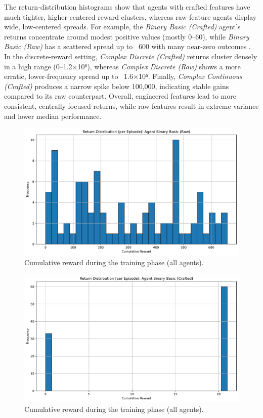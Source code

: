\documentclass[sigconf]{acmart}
\begin{document}
The return‐distribution histograms show that agents with crafted features have much tighter, higher‐centered reward clusters, whereas raw‐feature agents display wide, low‐centered spreads. For example, the \emph{Binary Basic (Crafted)} agent’s returns concentrate around modest positive values (mostly 0–60), while \emph{Binary Basic (Raw)} has a scattered spread up to ~600 with many near‐zero outcomes . In the discrete‐reward setting, \emph{Complex Discrete (Crafted)} returns cluster densely in a high range (0–1.2×10⁶), whereas \emph{Complex Discrete (Raw)} shows a more erratic, lower‐frequency spread up to ~1.6×10⁵. Finally, \emph{Complex Continuous (Crafted)} produces a narrow spike below 100,000, indicating stable gains compared to its raw counterpart. Overall, engineered features lead to more consistent, centrally focused returns, while raw features result in extreme variance and lower median performance.

\bigskip

\begin{figure}[t]
  \centering
  \includegraphics[width=\textwidth]{return_distribution_Binary Basic (Raw).pdf}
  \caption{Cumulative reward during the training phase (all agents).}
  \label{fig:return_distribution_Binary Basic (Raw)}
\end{figure}

\begin{figure}[t]
  \centering
  \includegraphics[width=\textwidth]{return_distribution_Binary Basic (Crafted).pdf}
  \caption{Cumulative reward during the training phase (all agents).}
  \label{fig:return_distribution_Binary Basic (Crafted)}
\end{figure}
\end{document}
